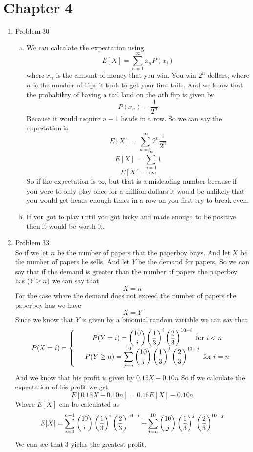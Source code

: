 \documentclass[11pt]{article}
\newcommand{\dsum} {\displaystyle\sum}
\begin{document}

\section{Chapter 4}
\begin{enumerate}
\item Problem 30
\begin{enumerate}[(a)]
\item
We can calculate the expectation using
$$E[X] = \sum_{n=1}^{\infty} x_nP(x_i)$$
where $x_n$ is the amount of money that you win. You win $2^n$ dollars, where $n$ is the number of flips it took to get your first tails. And we know that the probability of having a tail land on the $n$th flip is given by
$$P(x_n)=\frac{1}{2^n}$$
Because it would require $n-1$ heads in a row. So we can say the expectation is
$$E[X] = \sum_{n=1}^{\infty} 2^n\frac{1}{2^n}$$
$$E[X] = \sum_{n=1}^{\infty}1$$
$$E[X] = \infty$$
So if the expectation is $\infty$, but that is a misleading number because if you were to only play once for a million dollars it would be unlikely that you would get heads enough times in a row on you first try to break even.
\item If you got to play until you got lucky and made enough to be positive then it would be worth it.

\end{enumerate}
\item Problem 33\\
So if we let $n$ be the number of papers that the paperboy buys. And let $X$ be the number of papers he sells. And let $Y$ be the demand for papers. So we can say that if the demand is greater than the number of papers the paperboy has ($Y\ge n$) we can say that $$X = n$$ 
For the case where the demand does not exceed the number of papers the paperboy has we have
$$X=Y$$
Since we know that $Y$ is given by a binomial random variable we can say that
$$P(X=i) = \left\{\begin{array}{lc}
		&P(Y=i) = \dbinom{10}{i}\left(\dfrac{1}{3}\right)^i\left(\dfrac{2}{3}\right)^{10-i}\ \mbox{for } i<n\\
		&P(Y\ge n)= \dsum_{j=n}^{10}\dbinom{10}{j}\left(\dfrac{1}{3}\right)^j\left(\dfrac{2}{3}\right)^{10-j}\ \mbox{for } i=n\\
		\end{array}\right.$$
And we know that his profit is given by $0.15X-0.10n$ So if we calculate the expectation of his profit we get
$$E[0.15X-0.10n]=0.15E[X]-0.10n$$
Where $E[X]$ can be calculated as
$$E[X] = \sum_{i=0}^{n-1} \dbinom{10}{i}\left(\dfrac{1}{3}\right)^i\left(\dfrac{2}{3}\right)^{10-i} + \sum_{j=n}^{10} \dbinom{10}{j}\left(\dfrac{1}{3}\right)^j\left(\dfrac{2}{3}\right)^{10-j}$$
We can see that 3 yields the greatest profit.


\end{enumerate}
\end{document}
